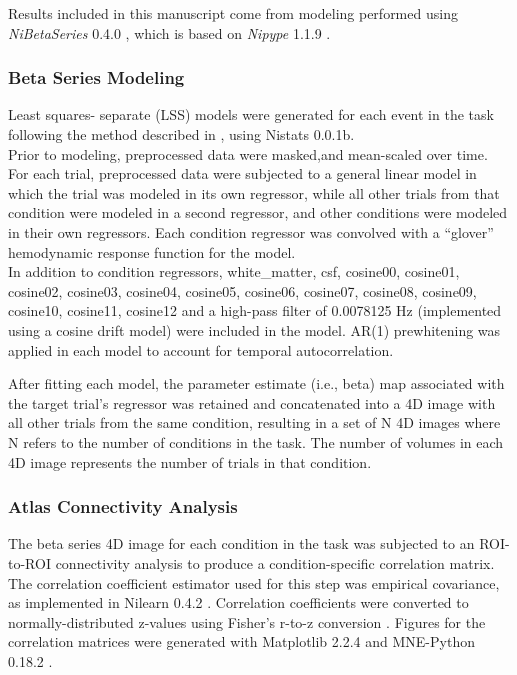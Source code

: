 \documentclass[
]{article}
\date{}
\begin{document}
Results included in this manuscript come from modeling performed using
\emph{NiBetaSeries} 0.4.0 \citep{Kent2018}, which is based on
\emph{Nipype} 1.1.9 \citep{Gorgolewski2011, Gorgolewski2018}.

\hypertarget{beta-series-modeling}{%
\subsubsection{Beta Series Modeling}\label{beta-series-modeling}}

Least squares- separate (LSS) models were generated for each event in
the task following the method described in \citet{Turner2012a}, using
Nistats 0.0.1b.\\
Prior to modeling, preprocessed data were masked,and mean-scaled over
time. For each trial, preprocessed data were subjected to a general
linear model in which the trial was modeled in its own regressor, while
all other trials from that condition were modeled in a second regressor,
and other conditions were modeled in their own regressors. Each
condition regressor was convolved with a ``glover'' hemodynamic response
function for the model.\\
In addition to condition regressors, white\_matter, csf, cosine00,
cosine01, cosine02, cosine03, cosine04, cosine05, cosine06, cosine07,
cosine08, cosine09, cosine10, cosine11, cosine12 and a high-pass filter
of 0.0078125 Hz (implemented using a cosine drift model) were included
in the model. AR(1) prewhitening was applied in each model to account
for temporal autocorrelation.

After fitting each model, the parameter estimate (i.e., beta) map
associated with the target trial's regressor was retained and
concatenated into a 4D image with all other trials from the same
condition, resulting in a set of N 4D images where N refers to the
number of conditions in the task. The number of volumes in each 4D image
represents the number of trials in that condition.

\hypertarget{atlas-connectivity-analysis}{%
\subsubsection{Atlas Connectivity
Analysis}\label{atlas-connectivity-analysis}}

The beta series 4D image for each condition in the task was subjected to
an ROI-to-ROI connectivity analysis to produce a condition-specific
correlation matrix. The correlation coefficient estimator used for this
step was empirical covariance, as implemented in Nilearn 0.4.2
\citep{Abraham2014}. Correlation coefficients were converted to
normally-distributed z-values using Fisher's r-to-z conversion
\citep{Fisher1915}. Figures for the correlation matrices were generated
with Matplotlib 2.2.4 \citep{Hunter2007} and MNE-Python 0.18.2
\citep{Gramfort2013, Gramfort2014}.
\end{document}
